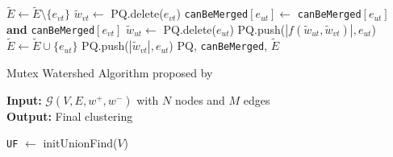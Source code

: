 {\begin{algorithm*}[p]
\begin{algorithmic}[1]
         
          \State $\tilde{E} \gets \tilde{E} \setminus \{e_{vt}\}$
          \State $\tilde{w}_{vt} \gets$ PQ.delete($e_{vt}$) 
          \State \texttt{canBeMerged}$[e_{ut}] \gets$ \texttt{canBeMerged}$[e_{ut}]$ \textbf{and} \texttt{canBeMerged}$[e_{vt}]$
            \State $\tilde{w}_{ut} \gets$ PQ.delete($e_{ut}$)  
            \State PQ.push($ |f(\tilde{w}_{ut}, \tilde{w}_{vt})|, e_{ut}$) 
          \Else
            \State $\tilde{E} \gets \tilde{E} \cup \{e_{ut}\}$
            \State PQ.push($ |\tilde{w}_{vt}|, e_{ut}$) 
          \EndIf
        \EndFor
        \State
        \Return PQ, \texttt{canBeMerged}, $\tilde{E}$
      \EndFunction
    \end{algorithmic}
    \label{detailed_alg}
  \end{algorithm*}
  \begin{algorithm*}[p]
    \caption{Mutex Watershed Algorithm proposed by \cite{wolf2018mutex}}
  \hspace*{\algorithmicindent} \textbf{Input:} $\mathcal{G}(V,E,w^+,w^-)$ with $N$ nodes and $M$ edges \\
  \hspace*{\algorithmicindent} \textbf{Output:} Final clustering \\
    \hspace*{\algorithmicindent} 
    \begin{algorithmic}[1]
        \State \texttt{UF} $\gets$ initUnionFind($V$) 

\end{algorithmic}
\end{algorithm*}}
